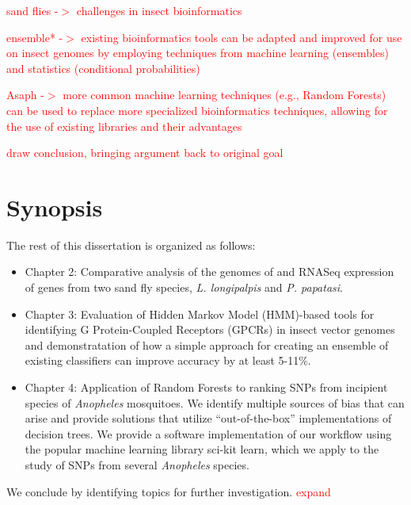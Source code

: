\textcolor{red}{sand flies -$>$ challenges in insect bioinformatics}

\textcolor{red}{ensemble* -$>$ existing bioinformatics tools can be adapted and improved for use on insect genomes by employing techniques from machine learning (ensembles) and statistics (conditional probabilities)}

\textcolor{red}{Asaph -$>$ more common machine learning techniques (e.g., Random Forests) can be used to replace more specialized bioinformatics techniques, allowing for the use of existing libraries and their advantages}

\textcolor{red}{draw conclusion, bringing argument back to original goal}

\section{Synopsis}
The rest of this dissertation is organized as follows:

\begin{itemize}
\item Chapter 2: Comparative analysis of the genomes of and RNASeq expression of genes from two sand fly species, \emph{L. longipalpis} and \emph{P. papatasi}.
\item Chapter 3: Evaluation of Hidden Markov Model (HMM)-based tools for identifying G Protein-Coupled Receptors (GPCRs) in insect vector genomes and demonstratation of how a simple approach for creating an ensemble of existing classifiers can improve accuracy by at least 5-11\%.
\item Chapter 4: Application of Random Forests to ranking SNPs from incipient species of \emph{Anopheles} mosquitoes.  We identify multiple sources of bias that can arise and provide solutions that utilize ``out-of-the-box'' implementations of decision trees.  We provide a software implementation of our workflow using the popular machine learning library sci-kit learn, which we apply to the study of SNPs from several \emph{Anopheles} species.
\end{itemize}

We conclude by identifying topics for further investigation. \textcolor{red}{expand}
